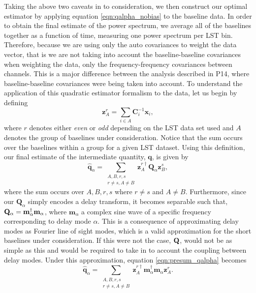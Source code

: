 \documentclass[twocolumn,numberedappendix]{emulateapj} \shorttitle{PSA64}
\newcommand{\qhat}{\hat{\mathbf{q}}}
\begin{document}
Taking the above two caveats in to consideration, we then construct our optimal
estimator by applying equation \ref{eqn:qalpha_nobias} to the baseline data. In
order to obtain the final estimate of the power spectrum, we average all of the
baselines together as a function of time, measuring one power spectrum per LST
bin. Therefore, because we are using only the auto covariances to weight the
data vector, that is we are not taking into account the baseline-baseline
covariances when weighting the data, only the frequency-frequency covariances
between channels. This is a major difference between the analysis described in
P14, where baseline-baseline covariances were being taken into account. To
understand the application of this quadratic estimator formalism to the data,
let us begin by defining 
\begin{equation}\label{eqn:presum_oqe}
    \mathbf{z}^{r}_{A} = \sum_{i\in{A}} \mathbf{C}_{i}^{-1}\mathbf{x}_{i},
\end{equation}
where $r$ denotes either \emph{even} or \emph{odd} depending on the LST data set
used and $A$ denotes the group of baselines under consideration. Notice that the
sum occurs over the baselines within a group for a given LST dataset. Using this
definition, our final estimate of the intermediate quantity, $\mathbf{q}$, is
given by 
\begin{equation}\label{eqn:presum_qalpha}
    \qhat_{\alpha} = \sum_{\substack{A,B,r,s\\r\ne{s},A\ne{B}}}\mathbf{z}^{r\dagger}_{A}\mathbf{Q}_{\alpha}\mathbf{z}^{s}_{B},
\end{equation}
where the sum occurs over $A,B,r,s$ where $r\ne{s}$ and $A\ne{B}$. Furthermore,
since our $\mathbf{Q}_{\alpha}$ simply encodes a delay transform, it becomes
separable such that, $\mathbf{Q}_{\alpha} =
\mathbf{m}_{\alpha}^{\dagger}\mathbf{m}_{\alpha}$, where $\mathbf{m}_{\alpha}$ a
complex sine wave of a specific frequency corresponding to delay mode $\alpha$.
This is a consequence of approximating delay modes as Fourier line of sight
modes, which is a valid approximation for the short baselines under
consideration. If this were not the case, $\mathbf{Q}$, would not be as simple as this
and would be required to take in to account the coupling between delay modes. 
Under this approximation, equation \ref{eqn:presum_qalpha} becomes
\begin{equation}
    \qhat_{\alpha} =
\sum_{\substack{A,B,r,s\\r\ne{s},A\ne{B}}}\mathbf{z}^{r\dagger}_{A}\mathbf{m}_{\alpha}^{\dagger}\mathbf{m}_{\alpha}\mathbf{z}^{r}_{A}.
\end{equation}
\end{document}
